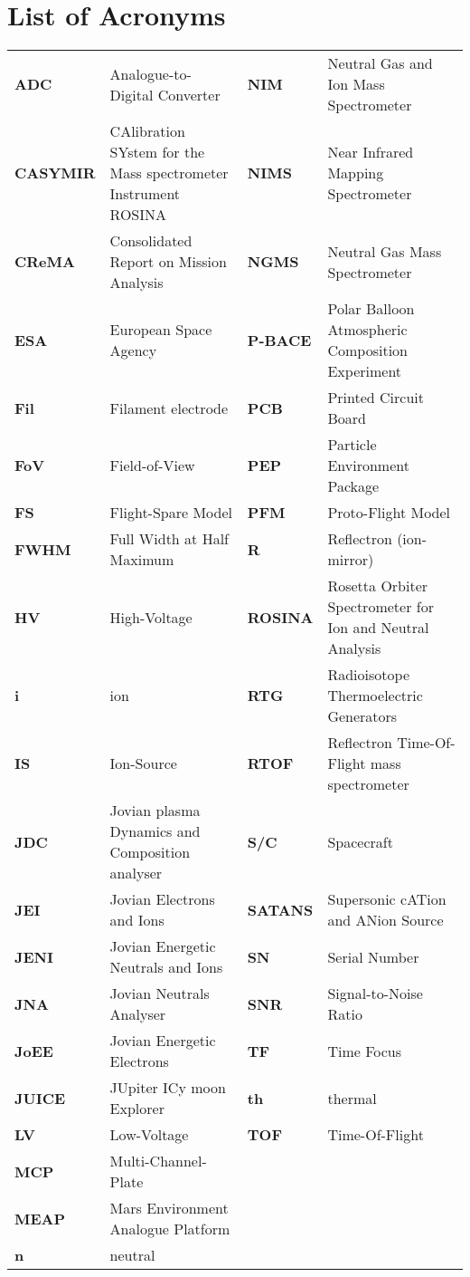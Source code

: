 \documentclass[a4paper, 12pt, abstracton]{scrartcl}
\begin{document}
	\newpage
	\thispagestyle{empty}
	\null
	\newpage
	
	\section*{List of Acronyms}
		
	\begin{small}
	\begin{longtable}{>{\bfseries}m{2cm}|m{5cm}|>{\bfseries}m{2cm}|m{5cm}}
		ADC		& Analogue-to-Digital Converter & NIM & Neutral Gas and Ion Mass Spectrometer \\
		CASYMIR	& CAlibration SYstem for the Mass spectrometer In\-stru\-ment ROSINA & NIMS	& Near Infrared Mapping Spectrometer\\
		CReMA	& Consolidated Report on Mission Analysis & NGMS & Neutral Gas Mass Spectrometer \\
		ESA		& European Space Agency & P-BACE	& Polar Balloon Atmospheric Composition Experiment \\
		Fil		& Filament electrode & PCB		& Printed Circuit Board \\
		FoV		& Field-of-View & PEP   	& Particle Environment Package \\
		FS		& Flight-Spare Model & PFM		& Proto-Flight Model \\
		FWHM  	& Full Width at Half Maximum & R		& Reflectron (ion-mirror) \\ 
		HV		& High-Voltage & ROSINA	& Rosetta Orbiter Spectrometer for Ion and Neutral Analysis\\
		i		& ion & RTG		& Radioisotope Thermoelectric Generators\\
		IS		& Ion-Source & RTOF	& Reflectron Time-Of-Flight mass spectrometer\\
		JDC		& Jovian plasma Dynamics and Composition analyser & S/C		& Spacecraft \\
		JEI		& Jovian Electrons and Ions & SATANS	& Supersonic cATion and ANion Source \\
		JENI	& Jovian Energetic Neutrals and Ions & SN		& Serial Number \\
		JNA		& Jovian Neutrals Analyser & SNR		& Signal-to-Noise Ratio \\
		JoEE	& Jovian Energetic Electrons & 	TF		& Time Focus \\
		JUICE 	& JUpiter ICy moon Explorer & th		& thermal \\ 
		LV 		& Low-Voltage & TOF		& Time-Of-Flight \\
		MCP		& Multi-Channel-Plate & &\\
		MEAP	& Mars Environment Analogue Platform & & \\
		n		& neutral & & \\
	\end{longtable}
	\end{small}
	\newpage
	\thispagestyle{empty}
	\null
	\newpage
	
\end{document}

